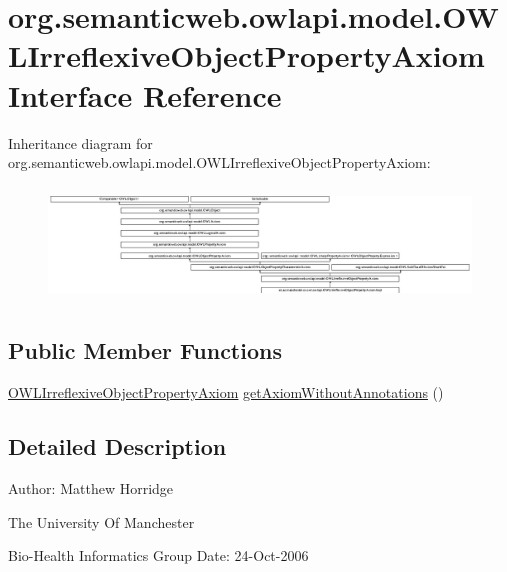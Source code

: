 \hypertarget{interfaceorg_1_1semanticweb_1_1owlapi_1_1model_1_1_o_w_l_irreflexive_object_property_axiom}{\section{org.\-semanticweb.\-owlapi.\-model.\-O\-W\-L\-Irreflexive\-Object\-Property\-Axiom Interface Reference}
\label{interfaceorg_1_1semanticweb_1_1owlapi_1_1model_1_1_o_w_l_irreflexive_object_property_axiom}
}
Inheritance diagram for org.\-semanticweb.\-owlapi.\-model.\-O\-W\-L\-Irreflexive\-Object\-Property\-Axiom\-:\begin{figure}[H]
\begin{center}
\leavevmode
\includegraphics[height=3.060109cm]{interfaceorg_1_1semanticweb_1_1owlapi_1_1model_1_1_o_w_l_irreflexive_object_property_axiom}
\end{center}
\end{figure}
\subsection*{Public Member Functions}
\begin{DoxyCompactItemize}
\item 
\hyperlink{interfaceorg_1_1semanticweb_1_1owlapi_1_1model_1_1_o_w_l_irreflexive_object_property_axiom}{O\-W\-L\-Irreflexive\-Object\-Property\-Axiom} \hyperlink{interfaceorg_1_1semanticweb_1_1owlapi_1_1model_1_1_o_w_l_irreflexive_object_property_axiom_a7c862ca7c2e02cf262a48b4ff20b7af3}{get\-Axiom\-Without\-Annotations} ()
\end{DoxyCompactItemize}


\subsection{Detailed Description}
Author\-: Matthew Horridge\par
 The University Of Manchester\par
 Bio-\/\-Health Informatics Group Date\-: 24-\/\-Oct-\/2006 


